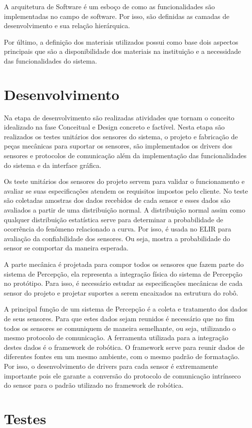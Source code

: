 A arquitetura de Software é um esboço de como as funcionalidades são implementadas no campo de software. Por isso, são definidas as camadas de desenvolvimento e sua relação hierárquica. 

Por último, a definição dos materiais utilizados possui como base dois aspectos principais que são a disponibilidade dos materiais na instituição e a necessidade das funcionalidades do sistema. 


\section{Desenvolvimento}
Na etapa de desenvolvimento são realizadas atividades que tornam o conceito idealizado na fase Conceitual e Design  concreto e factível. Nesta etapa são realizados os testes unitários dos sensores do sistema, o projeto  e fabricação de peças mecânicas para suportar os sensores, são implementados os drivers dos sensores e protocolos de comunicação além da implementação das funcionalidades do sistema e da interface gráfica. 

Os teste unitários dos  sensores do projeto servem para validar o funcionamento e avaliar se suas especificações atendem os requisitos impostos pelo cliente. No teste são coletadas amostras dos dados recebidos de cada sensor e esses dados são avaliados a partir de uma distribuição normal. A distribuição normal assim como qualquer distribuição estatística serve para determinar a probabilidade de ocorrência do fenômeno relacionado a curva. Por isso, é usada no ELIR para avaliação da confiabilidade dos sensores. Ou seja, mostra a probabilidade do sensor se comportar da maneira esperada.

A parte mecânica é projetada para compor todos os sensores que fazem parte do sistema de Percepção, ela representa a integração física do sistema de Percepção no protótipo. Para isso, é necessário estudar as especificações mecânicas de cada sensor do projeto e projetar suportes a serem encaixados na estrutura do robô.

A principal função de um sistema de Percepção é a coleta e tratamento dos dados de seus sensores. Para que estes dados sejam reunidos é necessário que no fim todos os sensores se comuniquem de maneira semelhante, ou seja, utilizando o mesmo protocolo de comunicação. A ferramenta utilizada para a integração destes dados é o framework de robótica. O framework serve para reunir dados de diferentes fontes em um mesmo ambiente, com o mesmo padrão de formatação. Por isso, o desenvolvimento de drivers para cada sensor é extremamente importante pois ele garante a conversão do protocolo de comunicação intrínseco do sensor para o padrão utilizado no framework de robótica.


\section{Testes}
